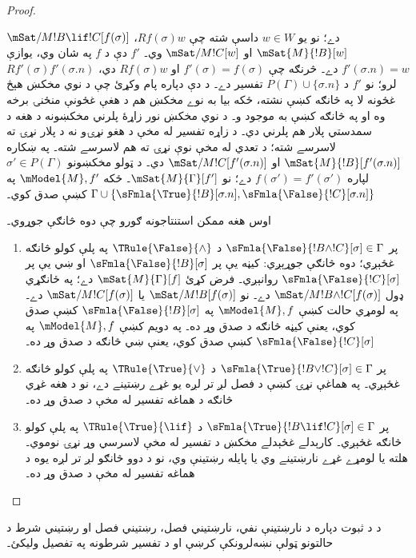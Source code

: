 \documentclass[../../../include/open-logic-section]{subfiles}
\begin{document}
\begin{proof}
\begin{enumerate}
  $\mSat/{M}{!B \lif !C}[f(\sigma)]$ دے؛ نو يو $w \in W$
  داسې شته چې $Rf(\sigma)w$، $\mSat{M}{!B}[w]$ او
  $\mSat/{M}{!C}[w]$ وي۔ $f'$ دې د $f$ په شان وي، يوازې
  $f'(\sigma.n) = w$ دے۔ څرنګه چې $f'(\sigma) = f(\sigma)$
  او $Rf(\sigma)w$ دي، $Rf'(\sigma)f'(\sigma.n)$ لرو؛ نو
  $f'$ د $P(\Gamma) \cup \{\sigma.n\}$ تفسير دے۔ د دې دپاره
  پام وکړئ چې د نوي مخکښ هېڅ غځونه لا په څانګه کښې نشته،
  ځکه بيا به نوے مخکښ هم د هغې غځونې منځنۍ برخه وه او
  په څانګه کښې به موجود و۔ د نوي مخکښ نور زاړۀ پلرني
  مخکښونه د هغه د سمدستي پلار هم پلرني دي۔ د زاړه تفسير
  له مخې د هغو نړۍو نه د پلار نړۍ ته لاسرسے شته؛ د تعدي
  له مخې نوې نړۍ ته هم لاسرسے شته۔ په ښکاره
  $\mSat{M}{!B}[f'(\sigma.n)]$ او
  $\mSat/{M}{!C}[f'(\sigma.n)]$ دي۔ د ټولو مخکښونو
  $\sigma' \in P(\Gamma)$ لپاره $f(\sigma') = f'(\sigma')$
  دے؛ نو $\mSat{M}{\Gamma}[f']$۔ ځکه $\mModel{M}, f'$ په
  $\Gamma \cup \{\sFmla{\True}{!B}[\sigma.n],\sFmla{\False}{!C}[\sigma.n]\}$
  کښې صدق کوي۔
\end{enumerate}
اوس هغه ممکن استنتاجونه ګورو چې دوه څانګې جوړوي۔
\begin{enumerate}
\item پر $\sFmla{\False}{!B \land !C}[\sigma] \in \Gamma$ د
  $\TRule{\False}{\land}$ په پلې کولو څانګه غځېږي؛ دوه
  څانګې جوړېږي: کيڼه يې پر $\sFmla{\False}{!B}[\sigma]$ او
  ښي يې پر $\sFmla{\False}{!C}[\sigma]$ روانېږي۔ فرض کړئ
  $\mSat{M}{\Gamma}[f]$ دے؛ په ځانګړي ډول
  $\mSat/{M}{!B \land !C}[f(\sigma)]$ دے۔ نو
  $\mSat/{M}{!B}[f(\sigma)]$ يا $\mSat/{M}{!C}[f(\sigma)]$
  دے۔ په لومړي حالت کښې $\mModel{M}, f$ په
  $\sFmla{\False}{!B}[\sigma]$ کښې صدق کوي، يعنې کيڼه څانګه
  د صدق وړ ده۔ په دويم کښې $\mModel{M}, f$ په
  $\sFmla{\False}{!C}[\sigma]$ کښې صدق کوي، يعنې ښي څانګه
  د صدق وړ ده۔
\item پر $\sFmla{\True}{!B \lor !C}[\sigma] \in \Gamma$ د
  $\TRule{\True}{\lor}$ په پلې کولو څانګه غځېږي۔ په هماغې
  نړۍ کښې د فصل لږ تر لږه يو غړے رښتينے دے، نو د هغه غړي
  څانګه د هماغه تفسير له مخې د صدق وړ ده۔
\item پر $\sFmla{\True}{!B \lif !C}[\sigma] \in \Gamma$ د
  $\TRule{\True}{\lif}$ په پلې کولو څانګه غځېږي۔ کارېدلے
  غځېدلے مخکښ د تفسير له مخې لاسرسي وړ نړۍ نوموي۔ هلته يا
  لومړے غړے نارښتينے وي يا پايله رښتينې وي، نو د دوو څانګو
  لږ تر لږه يوه د هماغه تفسير له مخې د صدق وړ ده۔
\end{enumerate}
\end{proof}

\begin{prob}
د  د ثبوت دپاره
د نارښتينې نفي، نارښتيني فصل، رښتيني فصل او رښتيني شرط د
حالتونو ټولې نښه‌لرونکې کرښې او د تفسير شرطونه په تفصيل وليکئ۔
\end{prob}
\end{document}
